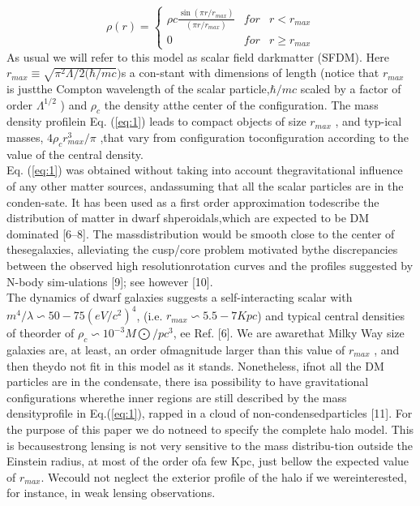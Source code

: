 \documentclass[10pt,a4paper]{article}
\begin{document}
\begin{multicols}{2}
\begin{equation} \label{eq:1}
\rho(r) = \left\{\begin{array}{lcc}
\rho c\frac{\sin(\pi r/r_{max})}{(\pi r/r_{max})}
& for & r<r_{max}\\
0 & for & r\geq r_{max}
\end{array} \right.
\end{equation}
As usual we will refer to this model as scalar field darkmatter (SFDM). Here \(r_{max} \equiv \sqrt{\pi^{2}\Lambda/2(\hbar/mc})\)s a con-stant with dimensions of length (notice that $r_{max}$ is justthe  Compton  wavelength  of  the  scalar  particle,\( \hbar/mc \) scaled by a factor of order $\Lambda^{1/2}$ ) and $\rho_{c}$ the density atthe center of the configuration.  The mass density profilein Eq. (\ref{eq:1}) leads to compact objects of size $r_{max}$ , and typ-ical masses, $4 \rho_{c}r^{3}_{max} / \pi$ ,that vary from configuration toconfiguration according to the value of the central density.\\
\indent
Eq. (\ref{eq:1}) was obtained without taking into account thegravitational influence of any other matter sources, andassuming that all the scalar particles are in the conden-sate.  It has been used as a first order approximation todescribe the distribution of matter in dwarf shperoidals,which are expected to be DM dominated [6–8].  The massdistribution would be smooth close to the center of thesegalaxies, alleviating the cusp/core problem motivated bythe  discrepancies  between  the  observed  high  resolutionrotation curves and the profiles suggested by N-body sim-ulations [9]; see however [10].\\
\indent
The   dynamics   of   dwarf   galaxies   suggests   a   self-interacting  scalar  with $m^{4}/\lambda \backsim 50 - 75 (eV/c^{2})^{4}$, (i.e. $r_{max} \backsim 5.5 - 7 Kpc$) and typical central densities of theorder of $\rho_{c} \backsim 10^{-3} M\bigodot/pc^{3}$, ee Ref. [6].  We are awarethat  Milky  Way  size  galaxies  are,  at  least,  an  order  ofmagnitude larger than this value of $r_{max}$ , and then theydo  not  fit  in  this  model  as  it  stands.   Nonetheless,  ifnot all the DM particles are in the condensate, there isa  possibility  to  have  gravitational  configurations  wherethe inner regions are still described by the mass densityprofile in Eq.(\ref{eq:1}), rapped in a cloud of non-condensedparticles [11].  For the purpose of this paper we do notneed to specify the complete halo model.  This is becausestrong lensing is not very sensitive to the mass distribu-tion outside the Einstein radius, at most of the order ofa few Kpc, just bellow the expected value of $r_{max}$.  Wecould not neglect the exterior profile of the halo if we wereinterested, for instance, in weak lensing observations.

\end{multicols}
\end{document}
